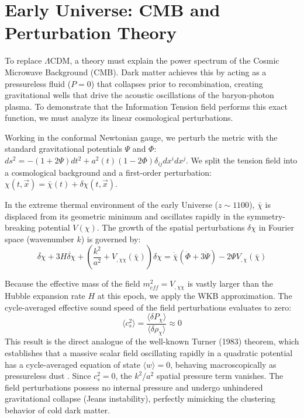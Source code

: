 \documentclass[twocolumn,amsmath,amssymb,floatfix]{article}
\newcommand{\lcdm}{\ensuremath{\Lambda}CDM}
\begin{document}
\section{Early Universe: CMB and Perturbation Theory}

To replace \lcdm, a theory must explain the power spectrum of the Cosmic Microwave Background (CMB). Dark matter achieves this by acting as a pressureless fluid ($P=0$) that collapses prior to recombination, creating gravitational wells that drive the acoustic oscillations of the baryon-photon plasma. To demonstrate that the Information Tension field performs this exact function, we must analyze its linear cosmological perturbations.

Working in the conformal Newtonian gauge, we perturb the metric with the standard gravitational potentials $\Psi$ and $\Phi$: $ds^2 = -(1+2\Psi)dt^2 + a^2(t)(1-2\Phi)\delta_{ij} dx^i dx^j$. We split the tension field into a cosmological background and a first-order perturbation: $\chi(t, \vec{x}) = \bar{\chi}(t) + \delta\chi(t, \vec{x})$.

In the extreme thermal environment of the early Universe ($z \sim 1100$), $\bar{\chi}$ is displaced from its geometric minimum and oscillates rapidly in the symmetry-breaking potential $V(\chi)$. The growth of the spatial perturbations $\delta\chi$ in Fourier space (wavenumber $k$) is governed by:
\begin{equation}
    \ddot{\delta\chi} + 3H\dot{\delta\chi} + \left( \frac{k^2}{a^2} + V_{,\chi\chi}(\bar{\chi}) \right) \delta\chi = \dot{\bar{\chi}} (\dot{\Phi} + 3\dot{\Psi}) - 2 \Psi V_{,\chi}(\bar{\chi})
\end{equation}

Because the effective mass of the field $m_{eff}^2 = V_{,\chi\chi}$ is vastly larger than the Hubble expansion rate $H$ at this epoch, we apply the WKB approximation. The cycle-averaged effective sound speed of the field perturbations evaluates to zero:
\begin{equation}
    \langle c_s^2 \rangle = \frac{\langle \delta P_\chi \rangle}{\langle \delta \rho_\chi \rangle} \approx 0
\end{equation}
This result is the direct analogue of the well-known Turner (1983) theorem, which establishes that a massive scalar field oscillating rapidly in a quadratic potential has a cycle-averaged equation of state $\langle w \rangle = 0$, behaving macroscopically as pressureless dust \citep{Turner1983}. Since $c_s^2 = 0$, the $k^2/a^2$ spatial pressure term vanishes. The field perturbations possess no internal pressure and undergo unhindered gravitational collapse (Jeans instability), perfectly mimicking the clustering behavior of cold dark matter.
\end{document}
